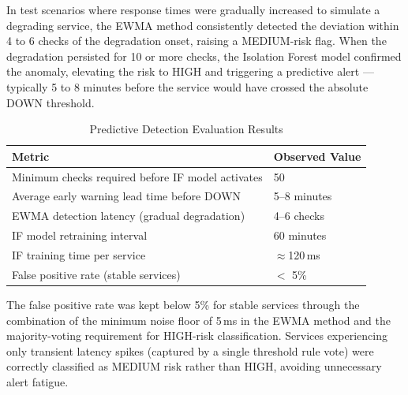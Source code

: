 \documentclass[12pt,a4paper,oneside]{report}
\begin{document}
\noindent In test scenarios where response times were gradually increased to simulate a degrading service, the EWMA method consistently detected the deviation within 4 to 6 checks of the degradation onset, raising a MEDIUM-risk flag. When the degradation persisted for 10 or more checks, the Isolation Forest model confirmed the anomaly, elevating the risk to HIGH and triggering a predictive alert --- typically 5 to 8 minutes before the service would have crossed the absolute DOWN threshold.

\begin{table}[H]
\centering
\begin{tabularx}{\textwidth}{|X|l|}
\hline
\textbf{Metric} & \textbf{Observed Value} \\
\hline
Minimum checks required before IF model activates & 50 \\
\hline
Average early warning lead time before DOWN & 5--8 minutes \\
\hline
EWMA detection latency (gradual degradation) & 4--6 checks \\
\hline
IF model retraining interval & 60 minutes \\
\hline
IF training time per service & $\approx$120\,ms \\
\hline
False positive rate (stable services) & $<$ 5\% \\
\hline
\end{tabularx}
\caption{Predictive Detection Evaluation Results}
\label{tab:prediction_results}
\end{table}

\noindent The false positive rate was kept below 5\% for stable services through the combination of the minimum noise floor of 5\,ms in the EWMA method and the majority-voting requirement for HIGH-risk classification. Services experiencing only transient latency spikes (captured by a single threshold rule vote) were correctly classified as MEDIUM risk rather than HIGH, avoiding unnecessary alert fatigue.
\end{document}

